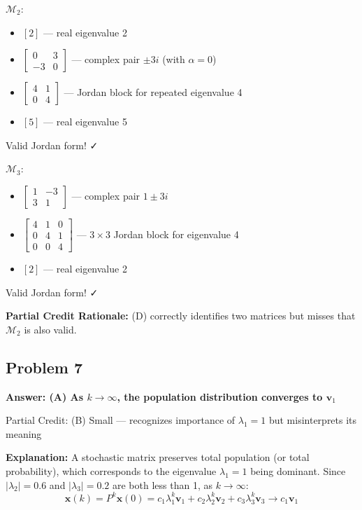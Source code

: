 \documentclass[12pt]{amsart}
\newcommand{\correct}[1]{{\color{correctgreen}\textbf{#1}}}
\newcommand{\partcred}[1]{{\color{partialblue}#1}}
\begin{document}
\textbf{$\mathcal{M}_2$}:
\begin{itemize}
\item $[2]$ — real eigenvalue 2
\item $\begin{bmatrix} 0 & 3 \\ -3 & 0 \end{bmatrix}$ — complex pair $\pm 3i$ (with $\alpha = 0$)
\item $\begin{bmatrix} 4 & 1 \\ 0 & 4 \end{bmatrix}$ — Jordan block for repeated eigenvalue 4
\item $[5]$ — real eigenvalue 5
\end{itemize}
Valid Jordan form! ✓

\textbf{$\mathcal{M}_3$}:
\begin{itemize}
\item $\begin{bmatrix} 1 & -3 \\ 3 & 1 \end{bmatrix}$ — complex pair $1 \pm 3i$
\item $\begin{bmatrix} 4 & 1 & 0 \\ 0 & 4 & 1 \\ 0 & 0 & 4 \end{bmatrix}$ — $3 \times 3$ Jordan block for eigenvalue 4
\item $[2]$ — real eigenvalue 2
\end{itemize}
Valid Jordan form! ✓

\textbf{Partial Credit Rationale:} (D) correctly identifies two matrices but misses that $\mathcal{M}_2$ is also valid.

\subsection*{Problem 7}
\correct{Answer: (A) As $k \to \infty$, the population distribution converges to $\mathbf{v}_1$}

\partcred{Partial Credit: (B) Small — recognizes importance of $\lambda_1 = 1$ but misinterprets its meaning}

\textbf{Explanation:} A stochastic matrix preserves total population (or total probability), which corresponds to the eigenvalue $\lambda_1 = 1$ being dominant. Since $|\lambda_2| = 0.6$ and $|\lambda_3| = 0.2$ are both less than 1, as $k \to \infty$:
$$\mathbf{x}(k) = P^k\mathbf{x}(0) = c_1 \lambda_1^k \mathbf{v}_1 + c_2 \lambda_2^k \mathbf{v}_2 + c_3 \lambda_3^k \mathbf{v}_3 \to c_1 \mathbf{v}_1$$
\end{document}
